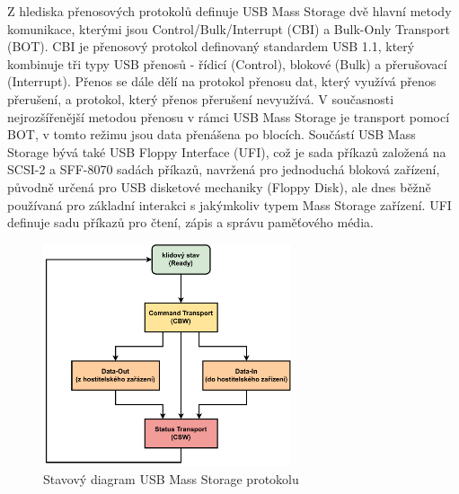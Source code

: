 Z hlediska přenosových protokolů definuje USB Mass Storage dvě hlavní metody komunikace, kterými jsou Control/Bulk/Interrupt (CBI) a Bulk-Only Transport (BOT). CBI je přenosový protokol definovaný standardem USB 1.1, který kombinuje tři typy USB přenosů - řídicí (Control), blokové (Bulk) a přerušovací (Interrupt). Přenos se dále dělí na protokol přenosu dat, který využívá přenos přerušení, a protokol, který přenos přerušení nevyužívá. V současnosti nejrozšířenější metodou přenosu v rámci USB Mass Storage je transport pomocí BOT, v tomto režimu jsou data přenášena po blocích.
Součástí USB Mass Storage bývá také USB Floppy Interface (UFI), což je sada příkazů založená na SCSI-2 a SFF-8070 sadách příkazů, navržená pro jednoduchá bloková zařízení, původně určená pro USB disketové mechaniky (Floppy Disk), ale dnes běžně používaná pro základní interakci s jakýmkoliv typem Mass Storage zařízení. UFI definuje sadu příkazů pro čtení, zápis a správu paměťového média. \cite{usb_standard_ufi}

\begin{figure}[h]
    \centering
    \includegraphics[width=0.65\textwidth]{obrazky-figures/mass_storage_protocol-cz.pdf}
    
    \caption{Stavový diagram USB Mass Storage protokolu \cite{silicon_labs_mass_storage_protocol}}
    \label{fig:mass-storage-protocol}
\end{figure}

